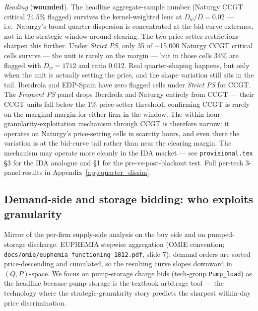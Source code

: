 \documentclass[11pt,a4paper]{article}
\begin{document}
\textit{Reading} (\textbf{wounded}). The headline aggregate-sample number (Naturgy CCGT critical 24.5\% flagged) survives the kernel-weighted lens at $D_w / D = 0.02$ --- i.e.\ Naturgy's broad quarter-dispersion is concentrated at the bid-curve extremes, not in the strategic window around clearing. The two price-setter restrictions sharpen this further. Under \emph{Strict PS}, only 35 of $\sim$15{,}000 Naturgy CCGT critical cells survive --- the unit is rarely on the margin --- but in those cells 34\% are flagged with $D_w = 1712$ and ratio 0.012. Real quarter-shaping happens, but only when the unit is actually setting the price, and the shape variation still sits in the tail. Iberdrola and EDP-Spain have zero flagged cells under \emph{Strict PS} for CCGT. The \emph{Frequent PS} panel drops Iberdrola and Naturgy entirely from CCGT --- their CCGT units fall below the $1\%$ price-setter threshold, confirming CCGT is rarely on the marginal margin for either firm in the window. The within-hour granularity-exploitation mechanism through CCGT is therefore narrow: it operates on Naturgy's price-setting cells in scarcity hours, and even there the variation is at the bid-curve tail rather than near the clearing margin. The mechanism may operate more cleanly in the IDA market --- see \texttt{provisional.tex} §3 for the IDA analogue and §1 for the pre-vs-post-blackout test. Full per-tech 3-panel results in Appendix~\ref{app:quarter_dissim}.


\subsection{Demand-side and storage bidding: who exploits granularity}\label{sec:bid_evidence:demand_storage}

Mirror of the per-firm supply-side analysis on the buy side and on pumped-storage discharge. EUPHEMIA stepwise aggregation (OMIE convention; \texttt{docs/omie/euphemia\_functioning\_1812.pdf}, slide 7): demand orders are sorted price-descending and cumulated, so the resulting curve slopes downward in $(Q, P)$-space. We focus on pump-storage charge bids (tech-group \texttt{Pump\_load}) as the headline because pump-storage is the textbook arbitrage tool --- the technology where the strategic-granularity story predicts the sharpest within-day price discrimination.
\end{document}
